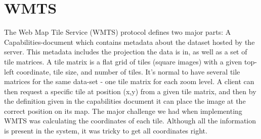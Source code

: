 \documentclass[11pt,a4paper,titlepage,oneside]{report}
\begin{document}
\section{WMTS}
The Web Map Tile Service (WMTS) protocol defines two major parts: A Capabilities-document which contains metadata about the dataset hosted by the server. This metadata includes the projection the data is in, as well as a set of tile matrices.  
A tile matrix is a flat grid of tiles (square images) with a given top-left coordinate, tile size, and number of tiles. It's normal to have several tile matrices for the same data-set - one tile matrix for each zoom level.  
A client can then request a specific tile at position (x,y) from a given tile matrix, and then by the definition given in the capabilities document it can place the image at the correct position on its map.  
The major challenge we had when implementing WMTS was calculating the coordinates of each tile. Although all the information is present in the system, it was tricky to get all coordinates right. 
\end{document}
